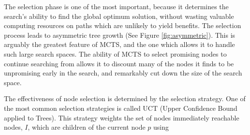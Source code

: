 \documentclass[12pt, letterpaper, twoside]{article}
\begin{document}
The selection phase is one of the most important, because it determines the search's ability to find the global optimum solution, without wasting valuable computing resources on paths which are unlikely to yield benefits. The selection process leads to asymmetric tree growth (See Figure \ref{fig:asymmetric}). This is arguably the greatest feature of MCTS, and the one which allows it to handle such large search spaces. The ability of MCTS to select promising nodes to continue searching from allows it to discount many of the nodes it finds to be unpromising early in the search, and remarkably cut down the size of the search space. 

The effectiveness of node selection is determined by the selection strategy. One of the most common selection strategies is called UCT (Upper Confidence Bound applied to Trees). This strategy weights the set of nodes immediately reachable nodes, $I$, which are children of the current node $p$ using 
	

\singlespacing



\end{document}
